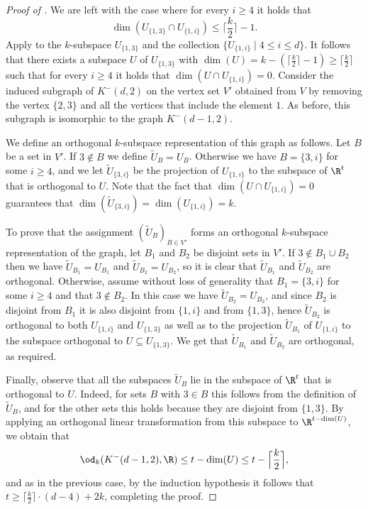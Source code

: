 \begin{proof}[Proof of ]
We are left with the case where for every $i \geq 4$ it holds that
\[\dim(U_{\{1,3\}} \cap U_{\{1,i\}}) \leq \Big\lceil \frac{k}{2} \Big\rceil -1.\]
Apply  to the $k$-subspace $U_{\{1,3\}}$ and the collection $\{ U_{\{1,i\}} \mid 4 \leq i \leq d \}$.
It follows that there exists a subspace $U$ of $U_{\{1,3\}}$ with $\dim(U) = k- (\lceil \frac{k}{2} \rceil -1) \geq \lceil \frac{k}{2} \rceil$ such that for every $i \geq 4$ it holds that $\dim(U \cap U_{\{1,i\}}) = 0$.
Consider the induced subgraph of $K^{-}(d,2)$ on the vertex set $V'$ obtained from $V$ by removing the vertex $\{2,3\}$ and all the vertices that include the element $1$. As before, this subgraph is isomorphic to the graph $K^{-}(d-1,2)$.

We define an orthogonal $k$-subspace representation of this graph as follows.
Let $B$ be a set in $V'$.
If $3 \notin B$ we define $\widetilde{U}_B = U_B$.
Otherwise we have $B = \{3,i\}$ for some $i \geq 4$, and we let $\widetilde{U}_{\{3,i\}}$ be the projection of $U_{\{1,i\}}$ to the subspace of $\R^t$ that is orthogonal to $U$.
Note that the fact that $\dim(U \cap U_{\{1,i\}}) = 0$ guarantees that $\dim(\widetilde{U}_{\{3,i\}}) = \dim(U_{\{1,i\}}) = k$.

To prove that the assignment $(\widetilde{U}_B)_{B \in V'}$ forms an orthogonal $k$-subspace representation of the graph, let $B_1$ and $B_2$ be disjoint sets in $V'$.
If $3 \notin B_1 \cup B_2$ then we have $\widetilde{U}_{B_1} = U_{B_1}$ and $\widetilde{U}_{B_2} = U_{B_2}$, so it is clear that $\widetilde{U}_{B_1}$ and $\widetilde{U}_{B_2}$ are orthogonal.
Otherwise, assume without loss of generality that $B_1 = \{3,i\}$ for some $i \geq 4$ and that $3 \notin B_2$.
In this case we have $\widetilde{U}_{B_2} = U_{B_2}$, and since $B_2$ is disjoint from $B_1$ it is also disjoint from $\{1,i\}$ and from $\{1,3\}$, hence $\widetilde{U}_{B_2}$ is orthogonal to both $U_{\{1,i\}}$ and $U_{\{1,3\}}$ as well as to the projection $\widetilde{U}_{B_1}$ of $U_{\{1,i\}}$ to the subspace orthogonal to $U \subseteq U_{\{1,3\}}$.
We get that $\widetilde{U}_{B_1}$ and $\widetilde{U}_{B_2}$ are orthogonal, as required.

Finally, observe that all the subspaces $\widetilde{U}_{B}$ lie in the subspace of $\R^t$ that is orthogonal to $U$.
Indeed, for sets $B$ with $3 \in B$ this follows from the definition of $\widetilde{U}_{B}$, and for the other sets this holds because they are disjoint from $\{1,3\}$.
By applying an orthogonal linear transformation from this subspace to $\R^{t-\dim(U)}$, we obtain that
\[ \od_k(K^{-}(d-1,2),\R) \leq t- \dim(U) \leq t- \Big\lceil \frac{k}{2} \Big\rceil,\]
and as in the previous case, by the induction hypothesis it follows that
$t \geq \lceil \frac{k}{2} \rceil \cdot (d-4)+2k$, completing the proof.
\end{proof}


